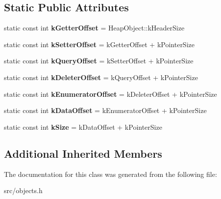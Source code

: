 \subsection*{Static Public Attributes}
\begin{DoxyCompactItemize}
\item 
\hypertarget{classv8_1_1internal_1_1_interceptor_info_a5a7a09c21536e5bf9e681cb7471c1f93}{}static const int {\bfseries k\+Getter\+Offset} = Heap\+Object\+::k\+Header\+Size\label{classv8_1_1internal_1_1_interceptor_info_a5a7a09c21536e5bf9e681cb7471c1f93}

\item 
\hypertarget{classv8_1_1internal_1_1_interceptor_info_afaa43ccd4e8941f93886c882032b58e1}{}static const int {\bfseries k\+Setter\+Offset} = k\+Getter\+Offset + k\+Pointer\+Size\label{classv8_1_1internal_1_1_interceptor_info_afaa43ccd4e8941f93886c882032b58e1}

\item 
\hypertarget{classv8_1_1internal_1_1_interceptor_info_ad34aeb460b38822a4344a7124487a210}{}static const int {\bfseries k\+Query\+Offset} = k\+Setter\+Offset + k\+Pointer\+Size\label{classv8_1_1internal_1_1_interceptor_info_ad34aeb460b38822a4344a7124487a210}

\item 
\hypertarget{classv8_1_1internal_1_1_interceptor_info_a5df7acb53275aec9c83dc91565e9726a}{}static const int {\bfseries k\+Deleter\+Offset} = k\+Query\+Offset + k\+Pointer\+Size\label{classv8_1_1internal_1_1_interceptor_info_a5df7acb53275aec9c83dc91565e9726a}

\item 
\hypertarget{classv8_1_1internal_1_1_interceptor_info_aaf2708a4d9fa94ef7cd075ddcfb093eb}{}static const int {\bfseries k\+Enumerator\+Offset} = k\+Deleter\+Offset + k\+Pointer\+Size\label{classv8_1_1internal_1_1_interceptor_info_aaf2708a4d9fa94ef7cd075ddcfb093eb}

\item 
\hypertarget{classv8_1_1internal_1_1_interceptor_info_a83a9480c9ca7a458d77ad277a4f82b86}{}static const int {\bfseries k\+Data\+Offset} = k\+Enumerator\+Offset + k\+Pointer\+Size\label{classv8_1_1internal_1_1_interceptor_info_a83a9480c9ca7a458d77ad277a4f82b86}

\item 
\hypertarget{classv8_1_1internal_1_1_interceptor_info_afd549e28b30209ac6e61b2d6923142c2}{}static const int {\bfseries k\+Size} = k\+Data\+Offset + k\+Pointer\+Size\label{classv8_1_1internal_1_1_interceptor_info_afd549e28b30209ac6e61b2d6923142c2}

\end{DoxyCompactItemize}
\subsection*{Additional Inherited Members}


The documentation for this class was generated from the following file\+:\begin{DoxyCompactItemize}
\item 
src/objects.\+h\end{DoxyCompactItemize}

